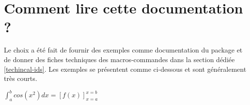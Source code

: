 \documentclass[12pt,a4paper]{book}
\newcommand\dintegrate[5]{%
  \int_{#2}^{#3} #4 d#5%
}
\newcommand\hook[5]{%
	\left[ #4 \right]_{#5=#2}^{#5=#3}%
}
\begin{document}
\section{Comment lire cette documentation ?}

Le choix a été fait de fournir des exemples comme documentation du package et de donner des fiches techniques des macros-commandes dans la section dédiée \ref{techincal-ids}.
Les exemples se présentent comme ci-dessous et sont généralement très courts.

\begin{latexex}
$\dintegrate*{a}{b}{cos(x^2)}{x}
 =
 \hook*{a}{b}{f(x)}{x}$
\end{latexex}
\end{document}
